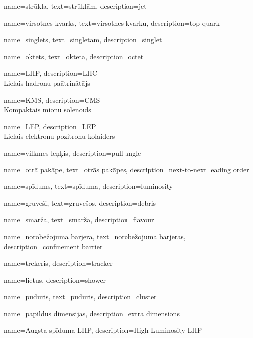 {
  name=strūkla,
  text=strūklām,
  description={jet}
}

{
  name=virsotnes kvarks,
  text=virsotnes kvarku,
  description={top quark}
}

{
  name=singlets,
  text=singletam,
  description={singlet}
}

{
  name=oktets,
  text=okteta,
  description={octet}
}

{
  name=LHP,
  description={LHC\\Lielais hadronu paātrinātājs}
}

{
  name=KMS,
  description={CMS\\Kompaktais mionu solenoīds}
}

{
  name=LEP,
  description={LEP\\Lielais elektronu pozitronu kolaiders}
}

{
  name=vilkmes leņķis,
  description={pull angle}
}

{
  name=otrā pakāpe,
  text=otrās pakāpes,
  description={next-to-next leading order}
}


{
  name=spīdums,
  text=spīduma,
  description={luminosity}
}

{
        name=gruveši,
        text=gruvešos,
        description={debris}
}

{
        name=smarža,
        text=smarža,
        description={flavour}
}

{
        name=norobežojuma barjera,
        text=norobežojuma barjeras,
        description={confinement barrier}
}

{
        name=trekeris,
        description={tracker}
}

{
        name=lietus,
        description={shower}
}

{
        name=puduris,
        text=puduris,
        description={cluster}
}

{
        name=papildus dimensijas,
        description={extra dimensions}
}

{
        name=Augsta spīduma LHP,
        description={High-Luminosity LHP}
}

